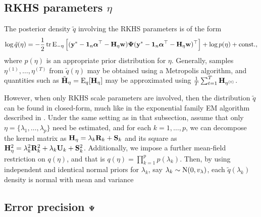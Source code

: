 \subsection[RKHS parameters eta]{RKHS parameters $\eta$}

The posterior density $\tilde q$ involving the RKHS parameters is of the form
\[
  \log\tilde q(\eta) =  -\frac{1}{2}\operatorname{tr}\operatorname{E}_{-\eta} \Big[ 
  ({\mathbf y}^* - {\mathbf 1}_n{\bm\alpha}^\top - {\mathbf H}_\eta{\mathbf w}) {\bm\Psi} ({\mathbf y}^* - {\mathbf 1}_n{\bm\alpha}^\top - {\mathbf H}_\eta{\mathbf w})^\top \Big] + \log p(\eta) + \text{const.}\hspace{0.01em},
\]
where $p(\eta)$ is an appropriate prior distribution for $\eta$.
Generally, samples $\eta^{(1)},\dots,\eta^{(T)}$ from $\tilde q(\eta)$ may be obtained using a Metropolis algorithm, and quantities such as $\tilde{{\mathbf H}}_{\eta} = \operatorname{E}_q[{\mathbf H}_{\eta}]$ may be approximated using $\frac{1}{T}\sum_{t=1}^T {\mathbf H}_{\eta^{(t)}}$.

However, when only RKHS scale parameters are involved, then the distribution $\tilde q$ can be found in closed-form, much like in the exponential family EM algorithm described in .
Under the same setting as in that subsection, assume that only $\eta = \{\lambda_1,\dots,\lambda_p\}$ need be estimated, and for each $k=1,\dots,p$, we can decompose the kernel matrix as ${\mathbf H}_\eta = \lambda_k {\mathbf R}_k + {\mathbf S}_k$ and its square as ${\mathbf H}_\eta^2 = \lambda_k^2 {\mathbf R}_k^2 + \lambda_k {\mathbf U}_k + {\mathbf S}_k^2$.
Additionally, we impose a further mean-field restriction on $q(\eta)$, and that is $q(\eta) = \prod_{k=1}^p p(\lambda_k)$.
Then, by using independent and identical normal priors for $\lambda_k$, say $\lambda_k \sim \operatorname{N}(0,v_\lambda)$, each $\tilde q(\lambda_k)$ density is normal with mean and variance


\subsection[Error precision Psi]{Error precision ${\bm\Psi}$}

